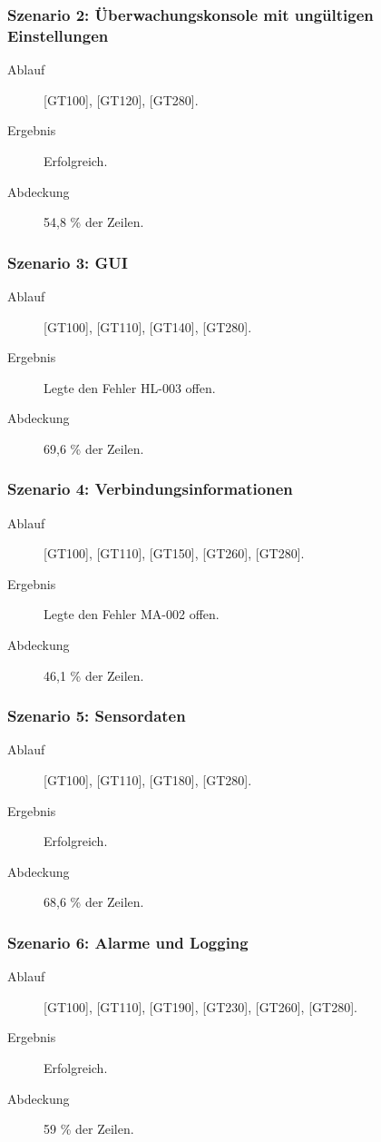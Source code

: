 \documentclass[parskip=full]{scrartcl}
\begin{document}
\subsubsection{Szenario 2: Überwachungskonsole mit ungültigen Einstellungen}
\begin{description}
	\item[Ablauf] [GT100], [GT120], [GT280].
	\item[Ergebnis] Erfolgreich.
	\item[Abdeckung] 54,8 \% der Zeilen.
\end{description}

\subsubsection{Szenario 3: GUI}
\begin{description}
	\item[Ablauf] [GT100], [GT110], [GT140], [GT280].
	\item[Ergebnis] Legte den Fehler HL-003 offen.
	\item[Abdeckung] 69,6 \% der Zeilen.
\end{description}

\subsubsection{Szenario 4: Verbindungsinformationen}
\begin{description}
	\item[Ablauf] [GT100], [GT110], [GT150], [GT260], [GT280].
	\item[Ergebnis] Legte den Fehler MA-002 offen.
	\item[Abdeckung] 46,1 \% der Zeilen.
\end{description}

\subsubsection{Szenario 5: Sensordaten}
\begin{description}
	\item[Ablauf] [GT100], [GT110], [GT180], [GT280].
	\item[Ergebnis] Erfolgreich.
	\item[Abdeckung] 68,6 \% der Zeilen.
\end{description}

\subsubsection{Szenario 6: Alarme und Logging}
\begin{description}
	\item[Ablauf] [GT100], [GT110], [GT190], [GT230], [GT260], [GT280].
	\item[Ergebnis] Erfolgreich.
	\item[Abdeckung] 59 \% der Zeilen.
\end{description}
\end{document}

